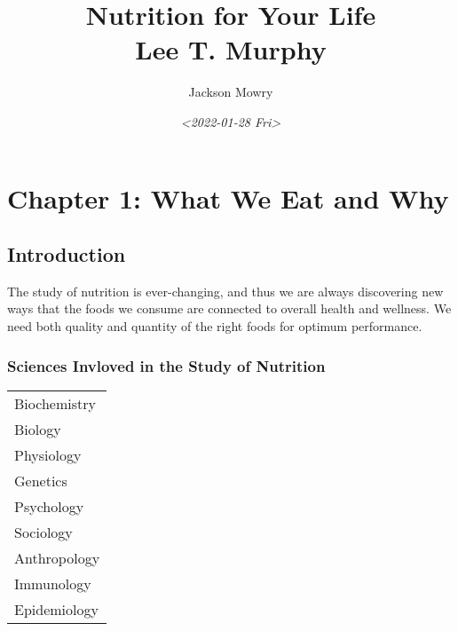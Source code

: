 \documentclass[letterpaper, 11pt]{article}
\author{Jackson Mowry}
\date{\textit{<2022-01-28 Fri>}}
\title{Nutrition for Your Life\\\medskip
\large Lee T. Murphy}
\begin{document}
\maketitle
\tableofcontents


\section{Chapter 1: What We Eat and Why}
\label{sec:org0d13a05}
\subsection{Introduction}
\label{sec:orgfd00cd5}
The study of nutrition is ever-changing, and thus we are always discovering new ways that the foods we consume are connected to overall health and wellness. We need both quality and quantity of the right foods for optimum performance.\\
\subsubsection{Sciences Invloved in the Study of Nutrition}
\label{sec:org3ba3c04}
\begin{center}
\begin{tabular}{l}
Biochemistry\\
Biology\\
Physiology\\
Genetics\\
Psychology\\
Sociology\\
Anthropology\\
Immunology\\
Epidemiology\\
\end{tabular}
\end{center}
\end{document}
